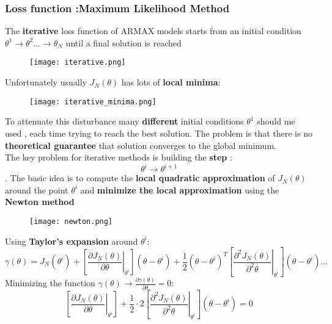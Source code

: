 \subsubsection{Loss function :Maximum Likelihood Method}
The \textbf{iterative} loss function of ARMAX models starts from an initial condition $\theta^1 \to \theta^2...\to \hat{\theta}_N$  until a final solution is reached
\begin{figure}[H]
 \centering
  \texttt{[image: iterative.png]}
\end{figure}
Unfortunately usually $J_N(\theta)$ has lots of \textbf{local minima}:
\begin{figure}[H]
 \centering
  \texttt{[image: iterative\_minima.png]}
\end{figure}
To attenuate this disturbance many \textbf{different} initial conditions  $\theta^1$ should me used , each time trying to reach the best solution. The problem is that there is no \textbf{theoretical guarantee} that solution converges to the global minimum.\\
The key problem for iterative methods is building the \textbf{step} : 
$$ \theta^i \to \theta^{i+1} $$.
The basic idea is to compute the \textbf{local quadratic approximation} of $J_N(\theta)$ around the point $\theta^i$ and \textbf{minimize the local approximation} using the \textbf{Newton method} 
\begin{figure}[H]
 \centering
  \texttt{[image: newton.png]}
\end{figure}
Using \textbf{Taylor's expansion} around $\theta^i$:
$$\gamma(\theta)=  J_N(\theta^i) + \left[\left. \frac{\partial{J_N(\theta)}}{\partial{\theta}}\right|_{\theta^i} \right](\theta-\theta^i)+ \frac{1}{2}(\theta-\theta^i)^T\left[\left. \frac{\partial^2{J_N(\theta)}}{\partial^2{\theta}}\right|_{\theta^i} \right](\theta-\theta^i)...$$
Minimizing the function $\gamma(\theta) \to \frac{\partial{\gamma(\theta)}}{\partial{\theta}}=0$:
$$  \left[\left. \frac{\partial{J_N(\theta)}}{\partial{\theta}}\right|_{\theta^i} \right] + \frac{1}{2} \cdot 2 \left[\left. \frac{\partial^2{J_N(\theta)}}{\partial^2{\theta}}\right|_{\theta^i} \right] (\theta - \theta^i) =0$$

